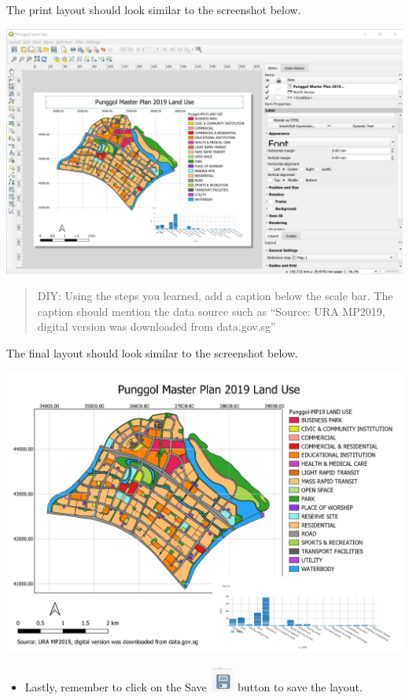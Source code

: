 \documentclass[
  letterpaper,
  DIV=11,
  numbers=noendperiod]{scrreprt}
\providecommand{\tightlist}{%
  \setlength{\itemsep}{0pt}\setlength{\parskip}{0pt}}\usepackage{longtable,booktabs,array}
\begin{document}
The print layout should look similar to the screenshot below.

\includegraphics{./img04/image88.jpg}

\begin{quote}
DIY: Using the steps you learned, add a caption below the scale bar. The
caption should mention the data source such as ``Source: URA MP2019,
digital version was downloaded from data.gov.sg''
\end{quote}

The final layout should look similar to the screenshot below.

\includegraphics{./img04/image89.jpg}

\begin{itemize}
\tightlist
\item
  Lastly, remember to click on the Save
  \includegraphics[width=0.3125in,height=0.3125in]{./img04/image90.jpg}
  button to save the layout.
\end{itemize}
\end{document}
